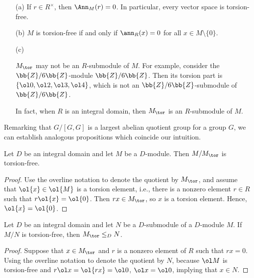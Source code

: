 \begin{exmp}
    \begin{enumerate}
        \item[(a)]
        {
            If $r\in R^\times$, then $\Ann_M(r)=0$.
            In particular, every vector space is torsion-free.
        }
        \item[(b)]
        {
            $M$ is torsion-free if and only if $\ann_R(x)=0$ for all $x\in M\setminus\{0\}$.
        }
        \item[(c)]
        {
            $M_\tor$ may not be an $R$-submodule of $M$.
            For example, consider the $\bb{Z}/6\bb{Z}$-module $\bb{Z}/6\bb{Z}$.
            Then its torsion part is $\{\ol 0, \ol 2, \ol 3, \ol 4\}$, which is not an $\bb{Z}/6\bb{Z}$-submodule of $\bb{Z}/6\bb{Z}$.

            In fact, when $R$ is an integral domain, then $M_\tor$ is an $R$-submodule of $M$.
        }
    \end{enumerate}
\end{exmp}

Remarking that $G/[G, G]$ is a largest abelian quotient group for a group $G$, we can establish analogous propositions which coincide our intuition.
\begin{prop}
    Let $D$ be an integral domain and let $M$ be a $D$-module.
    Then $M/M_\tor$ is torsion-free.
\end{prop}
\begin{proof}
    Use the overline notation to denote the quotient by $M_\tor$, and assume that $\ol{x}\in\ol{M}$ is a torsion element, i.e., there is a nonzero element $r\in R$ such that $r\ol{x}=\ol{0}$.
    Then $rx\in M_\tor$, so $x$ is a torsion element.
    Hence, $\ol{x}=\ol{0}$.
\end{proof}
\begin{prop}
    Let $D$ be an integral domain and let $N$ be a $D$-submodule of a $D$-module $M$.
    If $M/N$ is torsion-free, then $M_\tor\leq_D N$.
\end{prop}
\begin{proof}
    Suppose that $x\in M_\tor$ and $r$ is a nonzero element of $R$ such that $rx=0$.
    Using the overline notation to denote the quotient by $N$, because $\ol M$ is torsion-free and $r\ol x=\ol{rx}=\ol 0$, $\ol x=\ol 0$, implying that $x\in N$.
\end{proof}

